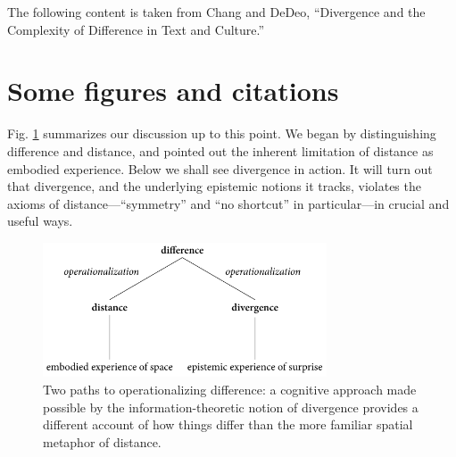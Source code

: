 The following content is taken from Chang and DeDeo, ``Divergence and the Complexity of Difference in Text and Culture.''

\section{Some figures and citations}

Fig. \ref{fig:operationalization_summary} summarizes our discussion up to this point. We began by distinguishing difference and distance, and pointed out the inherent limitation of distance as embodied experience. Below we shall see divergence in action. It will turn out that divergence, and the underlying epistemic notions it tracks, violates the axioms of distance---``symmetry'' and ``no shortcut'' in particular---in crucial and useful ways.

\begin{figure}[H]%
  \centering
  \includegraphics[width=0.75\textwidth]{fig/summary.pdf}
  \caption{Two paths to operationalizing difference: a cognitive approach made possible by the information-theoretic notion of divergence provides a different account of how things differ than the more familiar spatial metaphor of distance.}
  \label{fig:operationalization_summary}
\end{figure}


